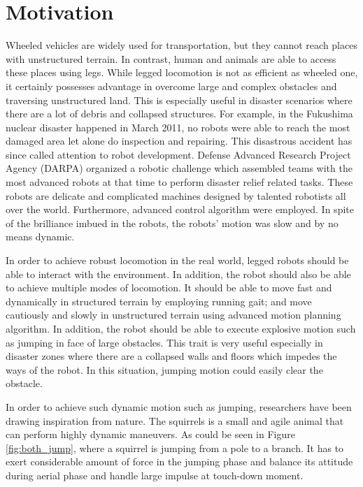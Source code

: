 \section{Motivation}
\label{sec:motivation}
	Wheeled vehicles are widely used for transportation, but they cannot reach places with unstructured terrain. In contrast, human and animals are able to access these places using legs. While legged locomotion is not as efficient as wheeled one, it certainly possesses advantage in overcome large and complex obstacles and traversing unstructured land. This is especially useful in disaster scenarios where there are a lot of debris and collapsed structures. For example, in the Fukushima nuclear disaster happened in March 2011, no robots were able to reach the most damaged area let alone do inspection and repairing. This disastrous accident has since called attention to robot development. Defense Advanced Research Project Agency (DARPA) organized a robotic challenge which assembled teams with the most advanced robots at that time to perform disaster relief related tasks. These robots are delicate and complicated machines designed by talented robotists all over the world. Furthermore, advanced control algorithm were employed. In spite of the brilliance imbued in the robots, the robots' motion was slow and by no means dynamic. 
	
	In order to achieve robust locomotion in the real world, legged robots should be able to interact with the environment. In addition, the robot should also be able to achieve multiple modes of locomotion. It should be able to move fast and dynamically in structured terrain by employing running gait; and move cautiously and slowly in unstructured terrain using advanced motion planning algorithm. In addition, the robot should be able to execute explosive motion such as jumping in face of large obstacles. This trait is very useful especially in disaster zones where there are a collapsed walls and floors which impedes the ways of the robot. In this situation, jumping motion could easily clear the obstacle.

	In order to achieve such dynamic motion such as jumping, researchers have been drawing inspiration from nature. The squirrels is a small and agile animal that can perform highly dynamic maneuvers. As could be seen in Figure \ref{fig:both_jump}, where a squirrel is jumping from a pole to a branch. It has to exert considerable amount of force in the jumping phase and balance its attitude during aerial phase and handle large impulse at touch-down moment.
	

